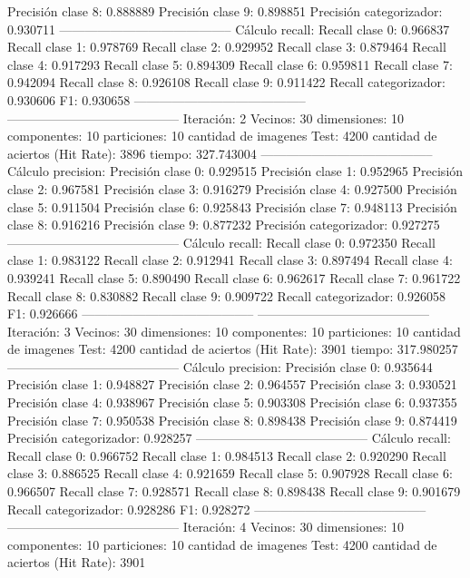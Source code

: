 Precisión clase 8: 0.888889
Precisión clase 9: 0.898851
Precisión categorizador: 0.930711
-----------------------------------------
Cálculo recall: 
Recall clase 0: 0.966837
Recall clase 1: 0.978769
Recall clase 2: 0.929952
Recall clase 3: 0.879464
Recall clase 4: 0.917293
Recall clase 5: 0.894309
Recall clase 6: 0.959811
Recall clase 7: 0.942094
Recall clase 8: 0.926108
Recall clase 9: 0.911422
Recall categorizador: 0.930606
F1: 0.930658
-----------------------------------------
-----------------------------------------
Iteración: 2
Vecinos: 30
dimensiones: 10
componentes: 10
particiones: 10
cantidad de imagenes Test: 4200
cantidad de aciertos (Hit Rate): 3896
tiempo: 327.743004
-----------------------------------------
Cálculo precision: 
Precisión clase 0: 0.929515
Precisión clase 1: 0.952965
Precisión clase 2: 0.967581
Precisión clase 3: 0.916279
Precisión clase 4: 0.927500
Precisión clase 5: 0.911504
Precisión clase 6: 0.925843
Precisión clase 7: 0.948113
Precisión clase 8: 0.916216
Precisión clase 9: 0.877232
Precisión categorizador: 0.927275
-----------------------------------------
Cálculo recall: 
Recall clase 0: 0.972350
Recall clase 1: 0.983122
Recall clase 2: 0.912941
Recall clase 3: 0.897494
Recall clase 4: 0.939241
Recall clase 5: 0.890490
Recall clase 6: 0.962617
Recall clase 7: 0.961722
Recall clase 8: 0.830882
Recall clase 9: 0.909722
Recall categorizador: 0.926058
F1: 0.926666
-----------------------------------------
-----------------------------------------
Iteración: 3
Vecinos: 30
dimensiones: 10
componentes: 10
particiones: 10
cantidad de imagenes Test: 4200
cantidad de aciertos (Hit Rate): 3901
tiempo: 317.980257
-----------------------------------------
Cálculo precision: 
Precisión clase 0: 0.935644
Precisión clase 1: 0.948827
Precisión clase 2: 0.964557
Precisión clase 3: 0.930521
Precisión clase 4: 0.938967
Precisión clase 5: 0.903308
Precisión clase 6: 0.937355
Precisión clase 7: 0.950538
Precisión clase 8: 0.898438
Precisión clase 9: 0.874419
Precisión categorizador: 0.928257
-----------------------------------------
Cálculo recall: 
Recall clase 0: 0.966752
Recall clase 1: 0.984513
Recall clase 2: 0.920290
Recall clase 3: 0.886525
Recall clase 4: 0.921659
Recall clase 5: 0.907928
Recall clase 6: 0.966507
Recall clase 7: 0.928571
Recall clase 8: 0.898438
Recall clase 9: 0.901679
Recall categorizador: 0.928286
F1: 0.928272
-----------------------------------------
-----------------------------------------
Iteración: 4
Vecinos: 30
dimensiones: 10
componentes: 10
particiones: 10
cantidad de imagenes Test: 4200
cantidad de aciertos (Hit Rate): 3901
